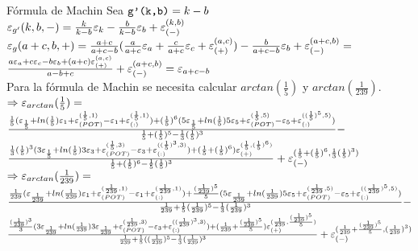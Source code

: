 \begin{subsection}{Fórmula de Machin}
	Sea $\texttt{g'(k,b)}=k-b$\\
	
	$\varepsilon _{g'}({k,b,-}) = \frac{k}{k-b}\varepsilon _{k} - \frac{b}{k-b}\varepsilon _{b} + \varepsilon _{({-})}^{({k,b})}$\\
	
	$\varepsilon _{g}({a+c,b,+}) = \frac{a+c}{a+c-b}(\frac{a}{a+c}\varepsilon _{a} + \frac{c}{a+c}\varepsilon _{c} + \varepsilon _{({+})}^{({a,c})}) - \frac{b}{a+c-b}\varepsilon _{b} + \varepsilon _{({-})}^{({a+c,b})} =$\\
	
	$\frac{a\varepsilon _{a} + c\varepsilon _{c} - b\varepsilon _{b} + (a+c)\varepsilon _{({+})}^{({a,c})}}{a-b+c} + \varepsilon _{({-})}^{({a+c,b})} = \varepsilon _{a+c-b}$\\
	
	Para la fórmula de Machin se necesita calcular $arctan(\frac{1}{5})$ y $arctan(\frac{1}{239})$.\\
	
	$\Rightarrow \varepsilon _{arctan}({\frac{1}{5}}) =$\\
	$\frac{\frac{1}{5}( \varepsilon _{\frac{1}{5}} + ln(\frac{1}{5}) \varepsilon _{1} + \varepsilon _{({POT})}^{({\frac{1}{5},1})} - \varepsilon _{1} + \varepsilon _{({:})}^{({\frac{1}{5},1})}) + (\frac{1}{5})^6( 5\varepsilon _{\frac{1}{5}} + ln(\frac{1}{5}) 5\varepsilon _{5} + \varepsilon _{({POT})}^{({\frac{1}{5},5})} - \varepsilon _{5} + \varepsilon _{({:})}^{({(\frac{1}{5})^5,5})}) }{\frac{1}{5}+(\frac{1}{5})^5-\frac{1}{3}(\frac{1}{5})^3} - $\\
	
	$\frac{\frac{1}{3}(\frac{1}{5})^3(3\varepsilon _{\frac{1}{5}} + ln(\frac{1}{5}) 3\varepsilon _{3} + \varepsilon _{({POT})}^{({\frac{1}{5},3})} - \varepsilon _{3} + \varepsilon _{({:})}^{({(\frac{1}{5})^3,3})}) + (\frac{1}{5}+(\frac{1}{5})^6)\varepsilon _{({+})}^{({\frac{1}{5},(\frac{1}{5})^6})}}{\frac{1}{5}+(\frac{1}{5})^6-\frac{1}{5}(\frac{1}{5})^3} + \varepsilon _{({-})}^{({\frac{1}{5}+(\frac{1}{5})^6,\frac{1}{3}(\frac{1}{5})^3})}$\\

	$\Rightarrow \varepsilon _{arctan}({\frac{1}{239}}) =$\\
	$\frac{\frac{1}{239}(\varepsilon _{\frac{1}{239}} + ln(\frac{1}{239}) \varepsilon _{1} + \varepsilon _{({POT})}^{({\frac{1}{239},1})} - \varepsilon _{1} + \varepsilon _{({:})}^{({\frac{1}{239},1})}) + \frac{(\frac{1}{239})^5}{5}(5\varepsilon _{\frac{1}{239}} + ln(\frac{1}{239}) 5\varepsilon _{5} + \varepsilon _{({POT})}^{({\frac{1}{239},5})} - \varepsilon _{5} + \varepsilon _{({:})}^{({(\frac{1}{239})^5,5})})}{\frac{1}{239}+\frac{1}{5}(\frac{1}{239})^5-\frac{1}{3}(\frac{1}{239})^3} -$ \\
	
	$\frac{\frac{(\frac{1}{239})^3}{3}(3\varepsilon _{\frac{1}{239}} + ln(\frac{1}{239}) 3\varepsilon _{\frac{1}{239}} + \varepsilon _{({POT})}^{({\frac{1}{239},3})} - \varepsilon _{3} + \varepsilon _{({:})}^{({(\frac{1}{239})^3,3})}) + (\frac{1}{239}+\frac{(\frac{1}{239})^5}{5})\varepsilon _{({+})}^{({\frac{1}{239},\frac{(\frac{1}{239})^5}{5}})}}{\frac{1}{239}+\frac{1}{5}((\frac{1}{239})^5-\frac{1}{3}(\frac{1}{239})^3}+\varepsilon _{({-})}^{({\frac{1}{239}+\frac{(\frac{1}{239})^5}{5},(\frac{1}{239})^3})}$\\
	

\end{subsection}
